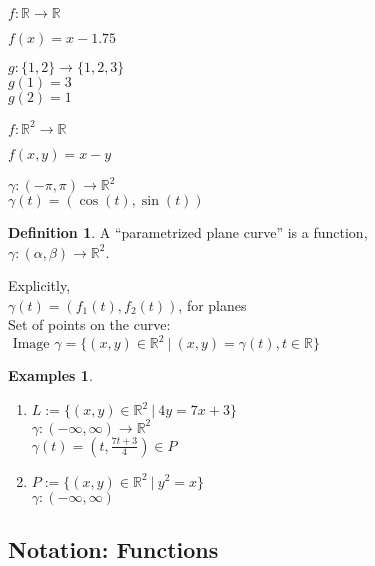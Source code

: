 \documentclass[twocolumn,20pt,fleqn]{extarticle}
\newcommand{\sep}{\vspace{0.5cm}}
\theoremstyle{plain}
\theoremstyle{definition}
\newtheorem*{definition}{Definition}
\newtheorem*{exmpls}{Examples}
\theoremstyle{remark}
\newenvironment*{examples}{\begin{exmpls} ~ \begin{enumerate}}{\end{enumerate}\end{exmpls}}
\begin{document}
$ f: \mathbb{R}  \to \mathbb{R}$

$f(x) = x - 1.75$\\

\sep

  $g : \{1,2\} \to \{1,2,3\}$\\
    $g(1) = 3$\\
    $g(2) = 1$\\

\sep

$ f: \mathbb{R}^2  \to \mathbb{R}$

$f(  x,y  ) = x - y$


\sep

$\gamma :  (-\pi,\pi)  \to \mathbb{R}^2$\\
$\gamma(t) = (\cos(t), \sin(t))$



\newpage



\begin{definition}
  A  ``parametrized plane curve''  is a  function,\\ $\gamma  : (\alpha, \beta) \to \mathbb{R}^2$.
\end{definition}

Explicitly,\\
$\gamma(t) = (f_1(t), f_2(t))$, for planes\\

Set of points on the curve:\\  $\textrm{ Image } \gamma = \{(x,y) \in \mathbb{R}^2 \ |\ (x,y) = \gamma(t), t \in \mathbb{R}\}$




\begin{examples}
  \item $L:=\{(x,y) \in \mathbb{R}^2\ |\ 4y = 7x + 3\}$\\
  $\gamma  : (-\infty,\infty) \to \mathbb{R}^2$ \\
  $\gamma(t) = (t, \frac{7t+3}{4})  \in P$\\
  \item $P:=\{(x,y) \in \mathbb{R}^2\ |\ y^2 = x\}$\\
  $\gamma  : (-\infty,\infty) $\end{examples}


\clearpage




\subsection{Notation: Functions}
\end{document}
